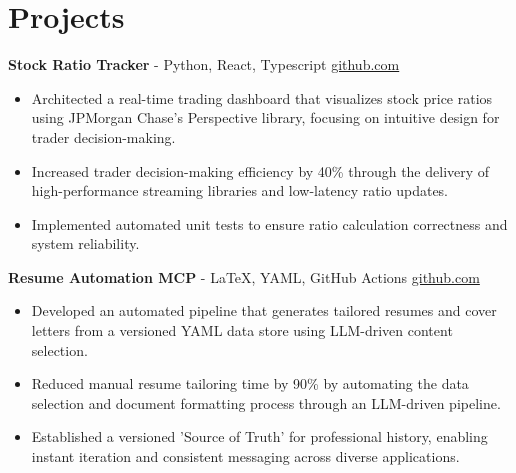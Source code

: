 \documentclass[11pt]{article}       %
\begin{document}

\vspace{-18.5pt}

\section*{Projects}

\textbf{Stock Ratio Tracker}{ - Python, React, Typescript} \hfill \href{https://github.com/Monica20030707/Trading-Dashboard_UI}{github.com} \\
\vspace{-9pt}
\begin{itemize}
  \item Architected a real-time trading dashboard that visualizes stock price ratios using JPMorgan Chase’s Perspective library, focusing on intuitive design for trader decision-making.
  \item Increased trader decision-making efficiency by 40\% through the delivery of high-performance streaming libraries and low-latency ratio updates.
  \item Implemented automated unit tests to ensure ratio calculation correctness and system reliability.
\end{itemize}

\textbf{Resume Automation MCP}{ - LaTeX, YAML, GitHub Actions} \hfill \href{https://github.com/Monica20030707/Tex_OrangeLeaf-mcp}{github.com} \\
\vspace{-9pt}
\begin{itemize}
  \item Developed an automated pipeline that generates tailored resumes and cover letters from a versioned YAML data store using LLM-driven content selection.
  \item Reduced manual resume tailoring time by 90\% by automating the data selection and document formatting process through an LLM-driven pipeline.
  \item Established a versioned 'Source of Truth' for professional history, enabling instant iteration and consistent messaging across diverse applications.
\end{itemize}
\end{document}
